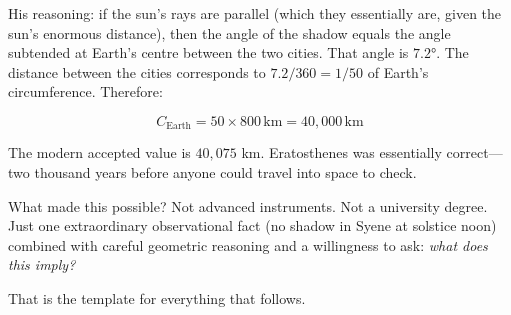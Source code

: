 \documentclass[12pt, a4paper, twoside]{book}
\theoremstyle{disc}
\begin{document}
His reasoning: if the sun's rays are parallel (which they essentially are, given the sun's enormous distance), then the angle of the shadow equals the angle subtended at Earth's centre between the two cities. That angle is $7.2°$. The distance between the cities corresponds to $7.2/360 = 1/50$ of Earth's circumference. Therefore:

\begin{equation}
  C_{\text{Earth}} = 50 \times 800\,\text{km} = 40{,}000\,\text{km}
\end{equation}

The modern accepted value is $40{,}075$ km. Eratosthenes was essentially correct---two thousand years before anyone could travel into space to check.

What made this possible? Not advanced instruments. Not a university degree. Just one extraordinary observational fact (no shadow in Syene at solstice noon) combined with careful geometric reasoning and a willingness to ask: \textit{what does this imply?}

That is the template for everything that follows.

\end{document}
